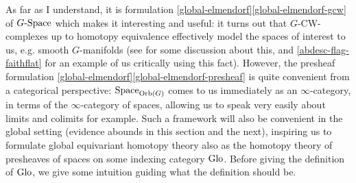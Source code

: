 As far as I understand, it is formulation
\cref{global-elmendorf}\cref{global-elmendorf-gcw} of $G\text{-}\mathrm{Space}$
which makes it interesting and useful: it turns out that
$G$-CW-complexes up to homotopy equivalence effectively model the
spaces of interest to us, e.g. smooth $G$-manifolds (see
\cite{mo-equivhmptygrps} for some discussion about this, and
\cref{abdesc-flag-faithflat} for an example of us critically using
this fact). However, the presheaf formulation
\cref{global-elmendorf}\cref{global-elmendorf-presheaf} is quite
convenient from a categorical perspective: $\mathrm{Space}_{\mathrm{Orb}(G)}$ comes to
us immediately as an $\infty$-category, in terms of the
$\infty$-category of spaces, allowing us to speak very easily about
limits and colimits for example. Such a framework will also be
convenient in the global setting (evidence abounds in this section and
the next), inspiring us to formulate global equivariant homotopy
theory also as the homotopy theory of presheaves of spaces on some
indexing category $\mathrm{Glo}$. Before giving the definition of $\mathrm{Glo}$, we
give some intuition guiding what the definition should be.

